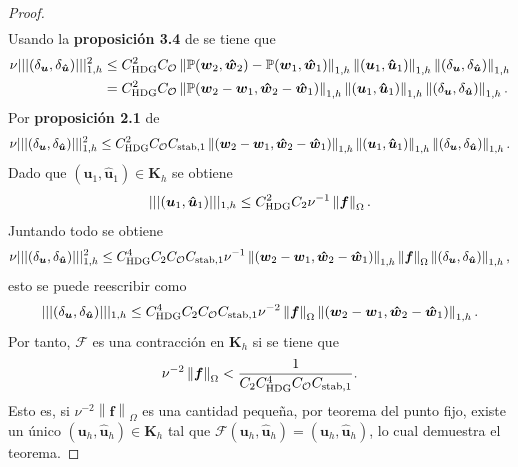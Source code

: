 \documentclass[10pt,a4paper]{report}
\newcommand{\bs}{\boldsymbol}
\providecommand{\norm}[1]{\left\lVert#1\right\rVert}
\begin{document}
\begin{proof}
\begin{align*}
    \end{align*} 
    Usando la \textbf{proposición 3.4} de \cite{CAC2017} se tiene que
    \begin{align*}
    	\nu||| (\delta_{\bs{u}},\delta_{\bs{\hat{u}}}) |||^{2}_{1,h}  &\leq C^{2}_{\textup{HDG}}C_{\mathcal{O}}\norm{\mathbb{P}(\bs{w}_{2},\bs{\hat{w}}_{2}) - \mathbb{P}(\bs{w}_{1},\bs{\hat{w}}_{1})}_{1,h}\norm{(\bs{u}_{1},\bs{\hat{\bs{u}}}_{1})}_{1,h}\norm{(\delta_{\bs{u}},\delta_{\bs{\hat{u}}})}_{1,h}\\
    	&= C^{2}_{\textup{HDG}}C_{\mathcal{O}}\norm{\mathbb{P}(\bs{w}_{2}-\bs{w}_{1},\bs{\hat{w}}_{2}-\bs{\hat{w}}_{1})}_{1,h}\norm{(\bs{u}_{1},\bs{\hat{\bs{u}}}_{1})}_{1,h}\norm{(\delta_{\bs{u}},\delta_{\bs{\hat{u}}})}_{1,h}.
    \end{align*}
    Por \textbf{proposición 2.1} de \cite{CAC2017}
    \begin{align*}
    	\nu||| (\delta_{\bs{u}},\delta_{\bs{\hat{u}}}) |||^{2}_{1,h}  \leq C^{2}_{\textup{HDG}}C_{\mathcal{O}}C_{\textup{stab},1}\norm{(\bs{w}_{2}-\bs{w}_{1},\bs{\hat{w}}_{2}-\bs{\hat{w}}_{1})}_{1,h}\norm{(\bs{u}_{1},\bs{\hat{\bs{u}}}_{1})}_{1,h}\norm{(\delta_{\bs{u}},\delta_{\bs{\hat{u}}})}_{1,h}.
    \end{align*}
    Dado que $(\bs{u}_{1},\bs{\hat{u}}_{1})\in\bs{K}_{h}$ se obtiene
    \begin{align*}
    	||| (\bs{u}_{1},\bs{\hat{u}}_{1}) |||_{1,h}\leq C^{2}_{\textup{HDG}}C_{2}\nu^{-1}\norm{\bs{f}}_{\Omega}.
    \end{align*} 
    Juntando todo se obtiene 
    \begin{align*}
    	\nu||| (\delta_{\bs{u}},\delta_{\bs{\hat{u}}}) |||^{2}_{1,h} \leq C^{4}_{\textup{HDG}}C_{2}C_{\mathcal{O}}C_{\textup{stab},1}\nu^{-1}\norm{(\bs{w}_{2}-\bs{w}_{1},\bs{\hat{w}}_{2}-\bs{\hat{w}}_{1})}_{1,h}\norm{\bs{f}}_{\Omega}\norm{(\delta_{\bs{u}},\delta_{\bs{\hat{u}}})}_{1,h},
    \end{align*}
    esto se puede reescribir como
    \begin{align*}
    	||| (\delta_{\bs{u}},\delta_{\bs{\hat{u}}}) |||_{1,h} \leq C^{4}_{\textup{HDG}}C_{2}C_{\mathcal{O}}C_{\textup{stab},1}\nu^{-2}\norm{\bs{f}}_{\Omega}\norm{(\bs{w}_{2}-\bs{w}_{1},\bs{\hat{w}}_{2}-\bs{\hat{w}}_{1})}_{1,h}.
    \end{align*}
    Por tanto, $\mathcal{F}$ es una contracción en $\bs{K}_{h}$ si se tiene que 
    \begin{align*}
    	\nu^{-2}\norm{\bs{f}}_{\Omega} < \frac{1}{C_{2}C^{4}_{\textup{HDG}}C_{\mathcal{O}}C_{\textup{stab},1}}.
    \end{align*}
    Esto es, si $\nu^{-2}\norm{\bs{f}}_{\Omega}$ es una cantidad pequeña, por teorema del punto fijo, existe un único $(\bs{u}_{h},\bs{\hat{u}}_{h})\in \bs{K}_{h}$ tal que $\mathcal{F}\left(\bs{u}_{h},\bs{\hat{u}}_{h}\right) = (\bs{u}_{h},\bs{\hat{u}}_{h})$, lo cual demuestra el teorema.
    \end{proof}
\end{document}
